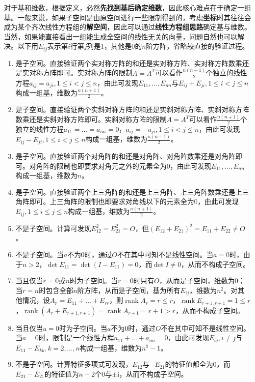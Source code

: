 \documentclass[a4paper,UTF8,fontset=windows,AutoFakeBold]{ctexart}
\DeclareMathOperator{\rank}{rank}
\newcommand*{\ir}{\mathrm{i}}
\begin{document}
\begin{enumerate}
    对于基和维数，根据定义，必然\textbf{先找到基后确定维数}，因此核心难点在于确定一组基。一般来说，如果子空间是由原空间进行一些限制得到的，考虑\textbf{坐标}时其往往会成为某个齐次线性方程组的\textbf{解空间}，因此可以通过\textbf{线性方程组思路}确定基与维数。当然，如果能直接看出一组能生成全空间的线性无关的向量，问题自然也可以解决。以下用$E_{ij}$表示第$i$行第$j$列是1，其他是0的$n$阶方阵，省略较直接的验证过程。
    \begin{enumerate}
        \item 是子空间。直接验证两个实对称方阵的和还是实对称方阵、实对称方阵数乘还是实对称方阵即可。实对称方阵的限制$A=A^T$可以看作$\frac{n(n-1)}{2}$个独立的线性方程$a_{ij}=a_{ji},1\le i<j\le n$，由此可发现$E_{11},\dots,E_{nn}$与$E_{ij}+E_{ji},1\le i<j\le n$构成一组基，维数为$\frac{n(n+1)}{2}$。
        \item 是子空间。直接验证两个实斜对称方阵的和还是实斜对称方阵、实斜对称方阵数乘还是实斜对称方阵即可。实斜对称方阵的限制$A=A^T$可以看作$\frac{n(n+1)}{2}$个独立的线性方程$a_{11}=\dots=a_{nn}=0$，$a_{ij}=-a_{ji},1\le i<j\le n$，由此可发现$E_{ij}-E_{ji},1\le i<j\le n$构成一组基，维数为$\frac{n(n-1)}{2}$。
        \item 是子空间。直接验证两个对角阵的和还是对角阵、对角阵数乘还是对角阵即可。对角阵的限制也即要求对角元之外的元素全为0，由此可发现$E_{11},\dots,E_{nn}$构成一组基，维数为$n$。
        \item 是子空间。直接验证两个上三角阵的和还是上三角阵、上三角阵数乘还是上三角阵即可。上三角阵的限制也即要求对角线以下的元素全为0，由此可发现$E_{ij},1\le i\le j\le n$构成一组基，维数为$\frac{n(n+1)}{2}$。
        \item 不是子空间。计算可发现$E_{12}^2=E_{21}^2=O$，但$(E_{12}+E_{21})^2=E_{11}+E_{22}\ne O$。
        \item 不是子空间。当$a$不为0时，通过$O$不在其中可知不是线性空间。当$a=0$时，由于$n>2$，$\det E_{11}=\det(I-E_{11})=0$，而$\det I\ne 0$，从而不构成子空间。
        \item 当且仅当$r=0$或$n$时为子空间。当$r=0$时只有$O$，从而是子空间，维数为0；当$r=n$时包含全部$n$阶方阵，从而是子空间，基为所有$E_{ij}$，维数为$n^2$。对其他情况，设$A_r=E_{11}+\dots+E_{rr}$，则$\rank A_r=r\le r$，$\rank E_{r+1,r+1}=1\le r$，$\rank(A_r+E_{r+1,r+1})=\rank A_{r+1}=r+1>r$，从而不构成子空间。
        \item 当且仅当$a=0$时为子空间。当$a$不为0时，通过$O$不在其中可知不是线性空间。当$a=0$时，限制是一个线性方程$a_{11}+\dots+a_{nn}=0$，由此可发现$E_{ij},i\ne j$与$E_{11}-E_{kk},k=2,\dots,n$构成一组基，维数为$n^2-1$。
        \item 不是子空间。计算特征多项式可发现，$E_{12}$与$-E_{21}$的特征值都全为0，而$E_{21}-E_{21}$的特征值为$n-2$个0与$\pm\ir$，从而不构成子空间。

\end{enumerate}
\end{enumerate}
\end{document}
